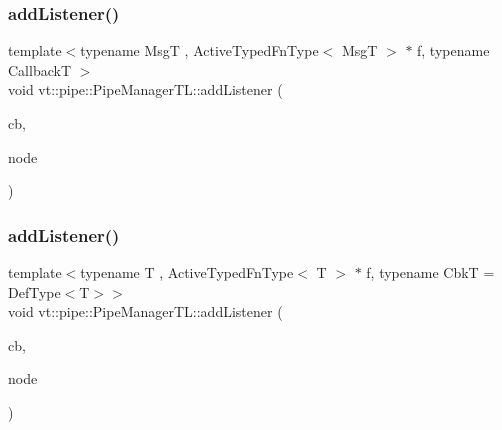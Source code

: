 \subsubsection{\texorpdfstring{add\+Listener()}{addListener()}\hspace{0.1cm}{\footnotesize\ttfamily [1/2]}}
{\footnotesize\ttfamily template$<$typename MsgT , Active\+Typed\+Fn\+Type$<$ Msg\+T $>$ $\ast$ f, typename CallbackT $>$ \\
void vt\+::pipe\+::\+Pipe\+Manager\+T\+L\+::add\+Listener (\begin{DoxyParamCaption}\item[{CallbackT const \&}]{cb,  }\item[{\hyperlink{namespacevt_a866da9d0efc19c0a1ce79e9e492f47e2}{Node\+Type} const \&}]{node }\end{DoxyParamCaption})}

\mbox{\label{structvt_1_1pipe_1_1_pipe_manager_t_l_a379d983dfbf654ed01281d96148175f3}} 
\subsubsection{\texorpdfstring{add\+Listener()}{addListener()}\hspace{0.1cm}{\footnotesize\ttfamily [2/2]}}
{\footnotesize\ttfamily template$<$typename T , Active\+Typed\+Fn\+Type$<$ T $>$ $\ast$ f, typename CbkT  = Def\+Type$<$\+T$>$$>$ \\
void vt\+::pipe\+::\+Pipe\+Manager\+T\+L\+::add\+Listener (\begin{DoxyParamCaption}\item[{CbkT const \&}]{cb,  }\item[{\hyperlink{namespacevt_a866da9d0efc19c0a1ce79e9e492f47e2}{Node\+Type} const \&}]{node }\end{DoxyParamCaption})}

\mbox{\label{structvt_1_1pipe_1_1_pipe_manager_t_l_a371e41dfb29c097dcf45fa2ae91cbf02}} 
